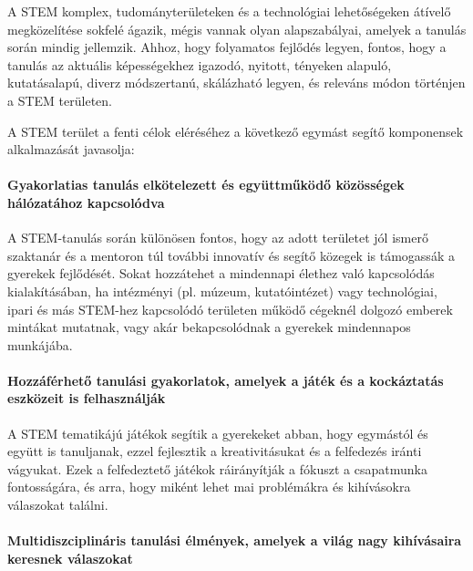 A STEM komplex, tudományterületeken és a technológiai lehetőségeken
átívelő megközelítése sokfelé ágazik, mégis vannak olyan alapszabályai,
amelyek a tanulás során mindig jellemzik. Ahhoz, hogy folyamatos
fejlődés legyen, fontos, hogy a tanulás az aktuális képességekhez igazodó,
nyitott, tényeken alapuló, kutatásalapú, diverz módszertanú,
skálázható legyen,
és releváns módon történjen a STEM területen.

A STEM terület a fenti célok eléréséhez a következő egymást segítő
komponensek alkalmazását javasolja:

\hypertarget{gyakorlatias-tanulas-elkotelezett-es-egyuttmukodo-kozossegek-halozatahoz-kapcsolodva}{%
\paragraph{Gyakorlatias tanulás elkötelezett és együttműködő közösségek
hálózatához
kapcsolódva}\label{gyakorlatias-tanulas-elkotelezett-es-egyuttmukodo-kozossegek-halozatahoz-kapcsolodva}}

A STEM-tanulás során különösen fontos, hogy az adott területet jól
ismerő szaktanár és a mentoron túl további innovatív és segítő közegek
is támogassák a gyerekek fejlődését. Sokat hozzátehet a mindennapi
élethez való kapcsolódás kialakításában, ha intézményi (pl. múzeum,
kutatóintézet) vagy technológiai, ipari és más STEM-hez kapcsolódó
területen működő cégeknél dolgozó emberek mintákat mutatnak, vagy akár
bekapcsolódnak a gyerekek mindennapos munkájába.

\hypertarget{hozzaferheto-tanulasi-gyakorlatok-amelyek-a-jatek-es-a-kockaztatas-eszkozeit-is-felhasznaljak}{%
\paragraph{Hozzáférhető tanulási gyakorlatok, amelyek a játék és a
kockáztatás eszközeit is
felhasználják}\label{hozzaferheto-tanulasi-gyakorlatok-amelyek-a-jatek-es-a-kockaztatas-eszkozeit-is-felhasznaljak}}

A STEM tematikájú játékok segítik a gyerekeket abban, hogy egymástól és
együtt is tanuljanak, ezzel fejlesztik a kreativitásukat és a felfedezés
iránti vágyukat. Ezek a felfedeztető játékok ráirányítják a fókuszt a
csapatmunka fontosságára, és arra, hogy miként lehet mai problémákra és
kihívásokra válaszokat találni.

\hypertarget{multidiszciplinaris-tanulasi-elmenyek-amelyek-a-vilag-nagy-kihivasaira-keresnek-valaszokat}{%
\paragraph{Multidiszciplináris tanulási élmények, amelyek a világ nagy
kihívásaira keresnek
válaszokat}\label{multidiszciplinaris-tanulasi-elmenyek-amelyek-a-vilag-nagy-kihivasaira-keresnek-valaszokat}}

